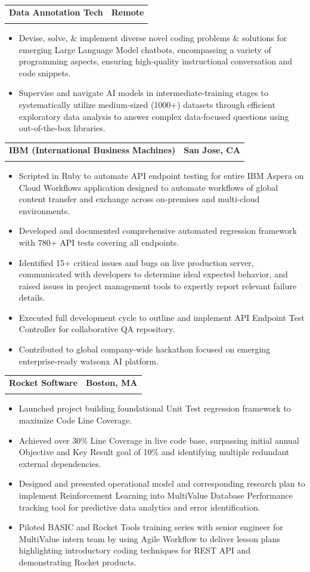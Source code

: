 \documentclass[letterpaper,11pt]{article}
\makeatletter
\newcommand{\resumeSubheading}[4]{
  \vspace{-2pt}\item
    \begin{tabular*}{1.0\textwidth}[t]{l@{\extracolsep{\fill}}r}
      \textbf{#1} & \textbf{\small #2} \\
      \hspace{12pt}\text{#3} & \text{\small #4} \\
      
    \end{tabular*}\vspace{-7pt}
}
\newcommand{\resumeItemListStart}{\begin{itemize}[itemsep=-1pt, parsep=2pt]}
\newcommand{\resumeItemListEnd}{\end{itemize}\vspace{-5pt}}
\newcommand{\resumeItem}[1]{\item\small{#1}}
\makeatother
\begin{document}
    \resumeSubheading
      {Data Annotation Tech} {Remote} 
      {LLM Training Engineer}{01/2024 -- 01/2025}
      \resumeItemListStart
        \resumeItem{Devise, solve, \& implement diverse novel coding problems \& solutions for emerging Large Language Model chatbots, encompassing a variety of programming aspects, ensuring high-quality instructional conversation and code snippets.}
        \resumeItem{Supervise and navigate AI models in intermediate-training stages to systematically utilize medium-sized (1000+) datasets through efficient exploratory data analysis to answer complex data-focused questions using out-of-the-box libraries.}
      \resumeItemListEnd 

    \resumeSubheading
      {IBM (International Business Machines)} {San Jose, CA} 
      {Automation and Testing Developer Intern}{06/2023 -- 09/2023}
      \resumeItemListStart
        \resumeItem{Scripted in Ruby to automate API endpoint testing for entire IBM Aspera on Cloud Workflows application designed to automate workflows of global content transfer and exchange across on-premises and multi-cloud environments.}
        \resumeItem{Developed and documented comprehensive automated regression framework with 780+ API tests covering all endpoints.}
        \resumeItem{Identified 15+ critical issues and bugs on live production server, communicated with developers to determine ideal expected behavior, and raised issues in project management tools to expertly report relevant failure details.}
        \resumeItem{Executed full development cycle to outline and implement API Endpoint Test Controller for collaborative QA repository.}
        \resumeItem{Contributed to global company-wide hackathon focused on emerging enterprise-ready watsonx AI platform.}
      \resumeItemListEnd 

    \resumeSubheading
      {Rocket Software} {Boston, MA}
      {Software Engineering Intern}{06/2022 -- 09/2022}
      \resumeItemListStart
        \resumeItem{Launched project building foundational Unit Test regression framework to maximize Code Line Coverage.}
        \resumeItem{Achieved over 30\% Line Coverage in live code base, surpassing initial annual Objective and Key Result goal of 10\% and identifying multiple redundant external dependencies.}
        \resumeItem{Designed and presented operational model and corresponding research plan to implement Reinforcement Learning into MultiValue Database Performance tracking tool for predictive data analytics and error identification.}
        \resumeItem{Piloted BASIC and Rocket Tools training series with senior engineer for MultiValue intern team by using Agile Workflow to deliver lesson plans highlighting introductory coding techniques for REST API and demonstrating Rocket products.}
      \resumeItemListEnd
\end{document}
